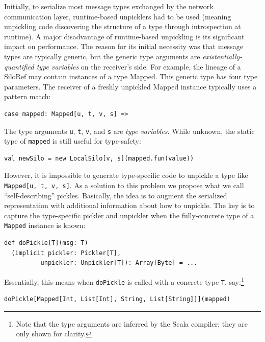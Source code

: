 \documentclass{jfp1}
\begin{document}
Initially, to serialize most message types exchanged by the network
communication layer, runtime-based unpicklers had to be used (meaning unpickling
code discovering the structure of a type through introspection at runtime). A
major disadvantage of runtime-based unpickling is its significant impact on
performance. The reason for its initial necessity was that message types are
typically generic, but the generic type arguments are {\em
existentially-quantified type variables} on the receiver's side. For example,
the lineage of a SiloRef may contain instances of a type Mapped. This generic
type has four type parameters. The receiver of a freshly unpickled Mapped
instance typically uses a pattern match:

\begin{lstlisting}
case mapped: Mapped[u, t, v, s] =>
\end{lstlisting}

The type arguments \verb|u|, \verb|t|, \verb|v|, and \verb|s| are {\em type
variables}. While unknown, the static type of \verb|mapped| is still useful for
type-safety:

\begin{lstlisting}
val newSilo = new LocalSilo[v, s](mapped.fun(value))
\end{lstlisting}

However, it is impossible to generate type-specific code to unpickle a type like
\\\verb|Mapped[u, t, v, s]|. As a solution to this problem we propose what we call
``self-describing'' pickles. Basically, the idea is to augment the serialized
representation with additional information about how to unpickle. The key is to
capture the type-specific pickler and unpickler when the fully-concrete type of
a \verb|Mapped| instance is known:

\begin{lstlisting}
def doPickle[T](msg: T)
  (implicit pickler: Pickler[T],
          unpickler: Unpickler[T]): Array[Byte] = ...
\end{lstlisting}

Essentially, this means when \verb|doPickle| is called with a concrete type
\verb|T|, say:\footnote{Note that the type arguments are inferred by the Scala
compiler; they are only shown for clarity.}

\begin{lstlisting}
doPickle[Mapped[Int, List[Int], String, List[String]]](mapped)
\end{lstlisting}
\end{document}
